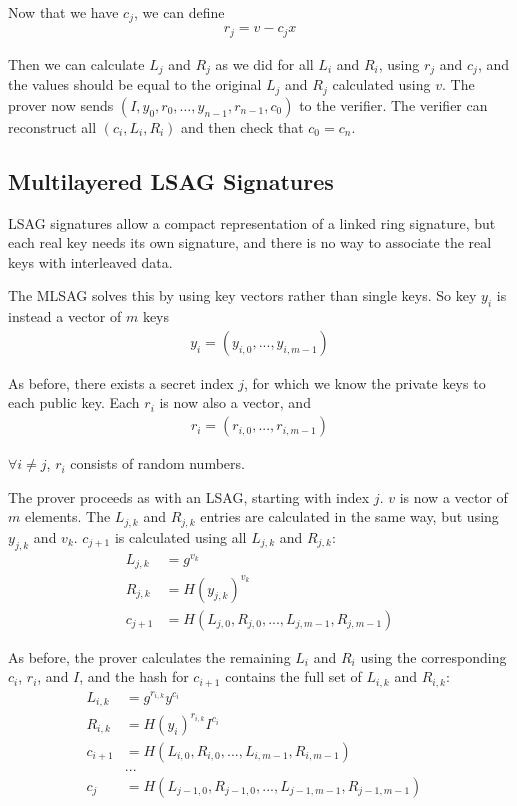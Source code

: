 \documentclass{article}
\begin{document}
Now that we have $c_j$, we can define
\begin{align}
  r_j = v - c_j x
\end{align}

Then we can calculate $L_j$ and $R_j$ as we did for all $L_i$ and $R_i$, using $r_j$ and $c_j$, and the values should be equal to the original $L_j$ and $R_j$ calculated using $v$. The prover now sends $(I, y_0, r_0, …, y_{n-1}, r_{n-1}, c_0)$ to the verifier.  The verifier can reconstruct all $(c_i, L_i, R_i)$ and then check that $c_0 = c_n$.


\subsection{Multilayered LSAG Signatures}

LSAG signatures allow a compact representation of a linked ring signature, but each real key needs its own signature, and there is no way to associate the real keys with interleaved data.

The MLSAG solves this by using key vectors rather than single keys.  So key $y_i$ is instead a vector of $m$ keys
\begin{align}
  y_i = (y_{i,0}, ..., y_{i,m-1})
\end{align}

As before, there exists a secret index $j$, for which we know the private keys to each public key.  Each $r_i$ is now also a vector, and
\begin{align}
  r_i = (r_{i,0}, ..., r_{i,m-1})
\end{align}

$\forall i \ne j$, $r_i$ consists of random numbers.

The prover proceeds as with an LSAG, starting with index $j$.  $v$ is now a vector of $m$ elements.  The $L_{j,k}$ and $R_{j,k}$ entries are calculated in the same way, but using $y_{j,k}$ and $v_k$.  $c_{j+1}$ is calculated using all $L_{j,k}$ and $R_{j,k}$:
\begin{align}
  L_{j,k} &= g^{v_k}\\
  R_{j,k} &= H(y_{j,k})^{v_k}\\
  c_{j+1} &= H(L_{j,0}, R_{j,0}, ..., L_{j,m-1}, R_{j,m-1})
\end{align}

As before, the prover calculates the remaining $L_i$ and $R_i$ using the corresponding $c_i$, $r_i$, and $I$, and the hash for $c_{i+1}$ contains the full set of $L_{i,k}$ and $R_{i,k}$:
\begin{align}
  L_{i,k} &= g^{r_{i,k}} y^{c_i}\\
  R_{i,k} &= H(y_i)^{r_{i,k}} I^{c_i}\\
  c_{i+1} &= H(L_{i,0}, R_{i,0}, ..., L_{i,m-1}, R_{i,m-1}) \\
  &...& \\
  c_j &= H(L_{j-1,0}, R_{j-1,0}, ..., L_{j-1,m-1}, R_{j-1,m-1}) 
\end{align}
\end{document}
